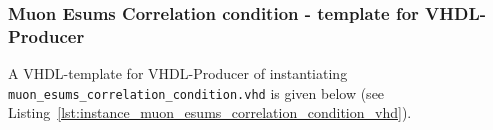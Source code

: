 \subsubsection{Muon Esums Correlation condition - template for VHDL-Producer}
A VHDL-template for VHDL-Producer of instantiating \texttt{muon\_esums\_correlation\_condition.vhd} is given below (see Listing~\ref{lst:instance_muon_esums_correlation_condition_vhd}).\\

% 
% 
